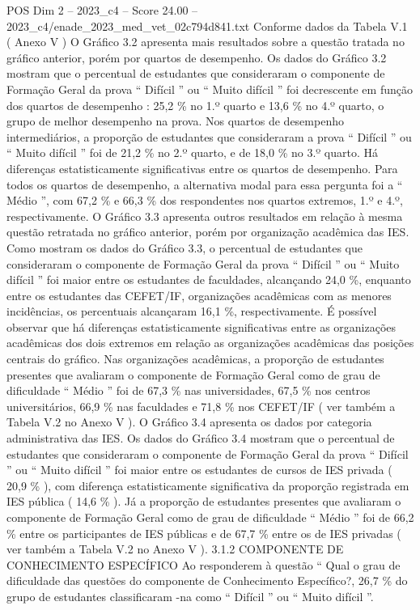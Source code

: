 \begin{textsample}{POS Dim 2 – 2023\_c4 – Score 24.00 – 2023\_c4/enade\_2023\_med\_vet\_02c794d841.txt}
Conforme dados da Tabela V.1 ( Anexo V ) O Gráfico 3.2 apresenta mais resultados sobre a questão tratada no gráfico anterior, porém por quartos de desempenho.
Os dados do Gráfico 3.2 mostram que o percentual de estudantes que consideraram o componente de Formação Geral da prova “ Difícil ” ou “ Muito difícil ” foi decrescente em função dos quartos de desempenho : 25,2 \% no 1.º quarto e 13,6 \% no 4.º quarto, o grupo de melhor desempenho na prova.
Nos quartos de desempenho intermediários, a proporção de estudantes que consideraram a prova “ Difícil ” ou “ Muito difícil ” foi de 21,2 \% no 2.º quarto, e de 18,0 \% no 3.º quarto.
Há diferenças estatisticamente significativas entre os quartos de desempenho.
Para todos os quartos de desempenho, a alternativa modal para essa pergunta foi a “ Médio ”, com 67,2 \% e 66,3 \% dos respondentes nos quartos extremos, 1.º e 4.º, respectivamente.
O Gráfico 3.3 apresenta outros resultados em relação à mesma questão retratada no gráfico anterior, porém por organização acadêmica das IES.
Como mostram os dados do Gráfico 3.3, o percentual de estudantes que consideraram o componente de Formação Geral da prova “ Difícil ” ou “ Muito difícil ” foi maior entre os estudantes de faculdades, alcançando 24,0 \%, enquanto entre os estudantes das CEFET/IF, organizações acadêmicas com as menores incidências, os percentuais alcançaram 16,1 \%, respectivamente.
É possível observar que há diferenças estatisticamente significativas entre as organizações acadêmicas dos dois extremos em relação as organizações acadêmicas das posições centrais do gráfico.
Nas organizações acadêmicas, a proporção de estudantes presentes que avaliaram o componente de Formação Geral como de grau de dificuldade “ Médio ” foi de 67,3 \% nas universidades, 67,5 \% nos centros universitários, 66,9 \% nas faculdades e 71,8 \% nos CEFET/IF ( ver também a Tabela V.2 no Anexo V ).
O Gráfico 3.4 apresenta os dados por categoria administrativa das IES.
Os dados do Gráfico 3.4 mostram que o percentual de estudantes que consideraram o componente de Formação Geral da prova “ Difícil ” ou “ Muito difícil ” foi maior entre os estudantes de cursos de IES privada ( 20,9 \% ), com diferença estatisticamente significativa da proporção registrada em IES pública ( 14,6 \% ).
Já a proporção de estudantes presentes que avaliaram o componente de Formação Geral como de grau de dificuldade “ Médio ” foi de 66,2 \% entre os participantes de IES públicas e de 67,7 \% entre os de IES privadas ( ver também a Tabela V.2 no Anexo V ). 3.1.2 COMPONENTE DE CONHECIMENTO ESPECÍFICO Ao responderem à questão “ Qual o grau de dificuldade das questões do componente de Conhecimento Específico?, 26,7 \% do grupo de estudantes classificaram -na como “ Difícil ” ou “ Muito difícil ”.

\end{textsample}
